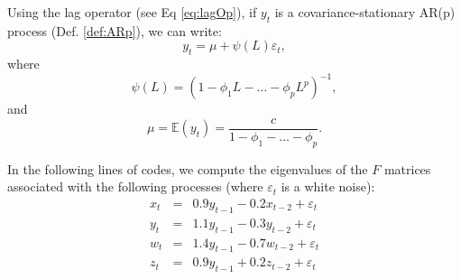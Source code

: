 \documentclass[
  12pt,
]{book}
\newenvironment{Shaded}{\begin{snugshade}}{\end{snugshade}}
\newcommand{\DecValTok}[1]{\textcolor[rgb]{0.00,0.00,0.81}{#1}}
\newcommand{\FloatTok}[1]{\textcolor[rgb]{0.00,0.00,0.81}{#1}}
\newcommand{\FunctionTok}[1]{\textcolor[rgb]{0.00,0.00,0.00}{#1}}
\newcommand{\NormalTok}[1]{#1}
\newcommand{\OtherTok}[1]{\textcolor[rgb]{0.56,0.35,0.01}{#1}}
\newcommand{\SpecialCharTok}[1]{\textcolor[rgb]{0.00,0.00,0.00}{#1}}
\theoremstyle{definition}
\theoremstyle{definition}
\theoremstyle{definition}
\theoremstyle{definition}
\theoremstyle{remark}
\begin{document}
Using the lag operator (see Eq \eqref{eq:lagOp}), if \(y_t\) is a covariance-stationary AR(p) process (Def. \ref{def:ARp}), we can write:
\[
y_t = \mu + \psi(L)\varepsilon_t,
\]
where
\begin{equation}
\psi(L) = (1 - \phi_1 L - \dots - \phi_p L^p)^{-1},
\end{equation}
and
\begin{equation}
\mu = \mathbb{E}(y_t) = \dfrac{c}{1-\phi_1 -\dots - \phi_p}.\label{eq:EAR}
\end{equation}

In the following lines of codes, we compute the eigenvalues of the \(F\) matrices associated with the following processes (where \(\varepsilon_t\) is a white noise):
\begin{eqnarray*}
x_t &=& 0.9 y_{t-1} -0.2 x_{t-2} + \varepsilon_t\\
y_t &=& 1.1 y_{t-1} -0.3 y_{t-2} + \varepsilon_t\\
w_t &=& 1.4 y_{t-1} -0.7 w_{t-2} + \varepsilon_t\\
z_t &=& 0.9 y_{t-1} +0.2 z_{t-2} + \varepsilon_t
\end{eqnarray*}

\begin{Shaded}
\end{Shaded}
\end{document}
